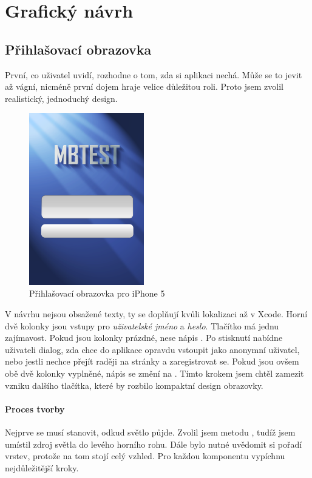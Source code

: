 \chapter{Grafický návrh}
\section{Přihlašovací obrazovka}
První, co uživatel uvidí, rozhodne o tom, zda si aplikaci nechá. Může se to jevit až vágní, nicméně první dojem hraje velice důležitou roli. Proto jsem zvolil realistický, jednoduchý design.

\begin{figure}[h]
	\begin{center}
		\includegraphics[width=5cm]{figures/AX_graphics/login_screen.jpg}
		\caption{Přihlašovací obrazovka pro iPhone 5}
		\label{fig:login}
	\end{center}
\end{figure}

V návrhu nejsou obsažené texty, ty se doplňují kvůli lokalizaci až v Xcode. Horní dvě kolonky jsou vstupy pro \emph{uživatelské jméno} a \emph{heslo}. Tlačítko má jednu zajímavost. Pokud jsou kolonky prázdné, nese nápis . Po stisknutí nabídne uživateli dialog, zda chce do aplikace opravdu vstoupit jako anonymní uživatel, nebo jestli nechce přejít raději na stránky a zaregistrovat se. Pokud jsou ovšem obě dvě kolonky vyplněné, nápis se změní na . Tímto krokem jsem chtěl zamezit vzniku dalšího tlačítka, které by rozbilo kompaktní design obrazovky.

\subsubsection*{Proces tvorby}
Nejprve se musí stanovit, odkud světlo půjde. Zvolil jsem metodu , tudíž jsem umístil zdroj světla do levého horního rohu. 
Dále bylo nutné uvědomit si pořadí vrstev, protože na tom stojí celý vzhled. Pro každou komponentu vypíchnu nejdůležitější kroky.

